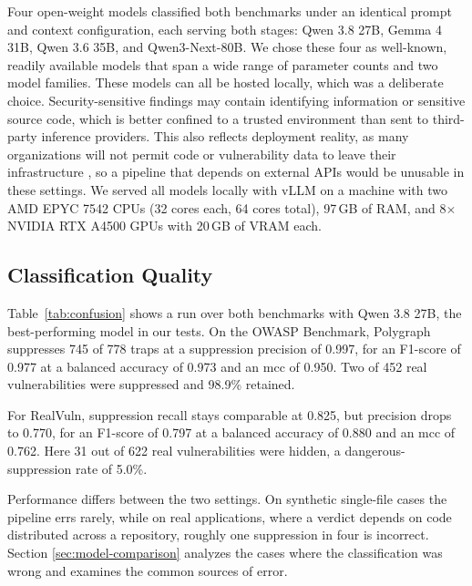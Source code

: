 Four open-weight models classified both benchmarks under an identical prompt and
context configuration, each serving both stages: Qwen 3.8 27B, Gemma 4 31B,
Qwen 3.6 35B, and Qwen3-Next-80B. We chose these four as well-known, readily available models that span a wide range of parameter counts and two model families.
These models can all be hosted locally, which was a deliberate choice. Security-sensitive findings may contain identifying information or sensitive source code, which is better confined to a trusted environment than sent to third-party inference providers. This also reflects deployment reality, as many organizations will not permit code or vulnerability data to leave their infrastructure \cite{khojah2025}, so a pipeline that depends on external APIs would be unusable in these settings.
We served all models locally with vLLM on a machine with two AMD EPYC 7542 CPUs (32 cores each, 64 cores total), 97\,GB of RAM, and 8$\times$NVIDIA RTX A4500 GPUs with 20\,GB of VRAM each.

\subsection{Classification Quality}

Table~\ref{tab:confusion} shows a run over both benchmarks with Qwen 3.8 27B, the best-performing model in our tests. On the OWASP Benchmark, Polygraph suppresses 745 of 778 traps at a suppression
precision of 0.997, for an F1-score of 0.977 at a balanced accuracy of 0.973
and an \ac{mcc} of 0.950. Two of 452 real vulnerabilities were suppressed and 98.9\%
retained.

For RealVuln, suppression recall stays comparable at 0.825, but precision
drops to 0.770, for an F1-score of 0.797 at a balanced accuracy of 0.880 and an
\ac{mcc} of 0.762. Here 31 out of 622 real vulnerabilities were hidden, a dangerous-suppression
rate of 5.0\%.

Performance differs between the two settings. On synthetic single-file cases the pipeline errs rarely, while on real applications, where a verdict depends on code distributed across a repository, roughly one suppression in four is incorrect. Section \ref{sec:model-comparison} analyzes the cases where the classification was wrong and examines the common sources of error.

